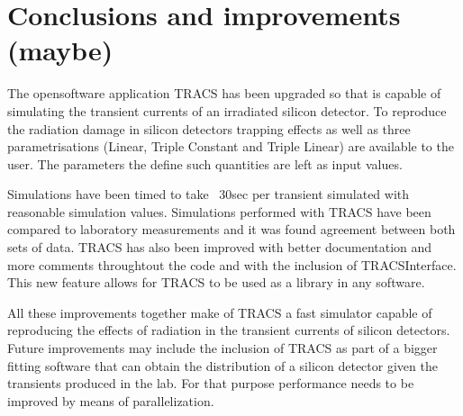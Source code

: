 \chapter{Conclusions and improvements (maybe)}

The opensoftware application TRACS has been upgraded so that is capable of simulating the transient currents of an irradiated silicon detector. To reproduce the radiation damage in silicon detectors trapping effects as well as three \neff parametrisations (Linear, Triple Constant and Triple Linear) are available to the user. The parameters the define such quantities are left as input values.

Simulations have been timed to take ~30sec per transient simulated with reasonable simulation values. Simulations performed with TRACS have been compared to laboratory measurements and it was found agreement between both sets of data. TRACS has also been improved with better documentation and more comments throughtout the code and with the inclusion of TRACSInterface. This new feature allows for TRACS to be used as a library in any software.

All these improvements together make of TRACS a fast simulator capable of reproducing the effects of radiation in the transient currents of silicon detectors. Future improvements may include the inclusion of TRACS as part of a bigger fitting software that can obtain the \neff distribution of a silicon detector given the transients produced in the lab. For that purpose performance needs to be improved by means of parallelization.


